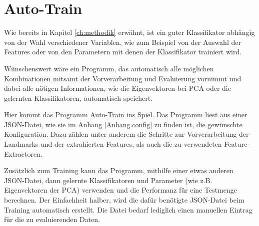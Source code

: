 \section{Auto-Train}
Wie bereits in Kapitel \ref{ch:methodik} erwähnt, ist ein guter Klassifikator abhängig von der Wahl verschiedener Variablen, wie zum Beispiel
von der Auswahl der Features oder von den Parametern mit denen der Klassifikator trainiert wird.

Wünschenswert wäre ein Programm, das automatisch alle möglichen Kombinationen mitsamt der Vorverarbeitung und Evaluierung vornimmt und dabei alle nötigen Informationen, wie die Eigenvektoren bei PCA oder die gelernten Klassifikatoren, automatisch speichert.

Hier kommt das Programm Auto-Train ins Spiel. Das Programm liest aus einer JSON-Datei, wie sie im Anhang \ref{Anhang.config} zu finden ist, die gewünschte Konfiguration. Dazu zählen unter anderem die Schritte zur Vorverarbeitung der Landmarks und der extrahierten Features, als auch die zu verwendeten Feature-Extractoren. 

Zusätzlich zum Training kann das Programm, mithilfe einer etwas anderen JSON-Datei, dann gelernte Klassifikatoren und Parameter (wie z.B. Eigenvektoren der PCA) verwenden und die Performanz für eine Testmenge berechnen.
Der Einfachheit halber, wird die dafür benötigte JSON-Datei beim Training automatisch erstellt. Die Datei bedarf lediglich einen manuellen Eintrag für die zu evaluierenden Daten.





